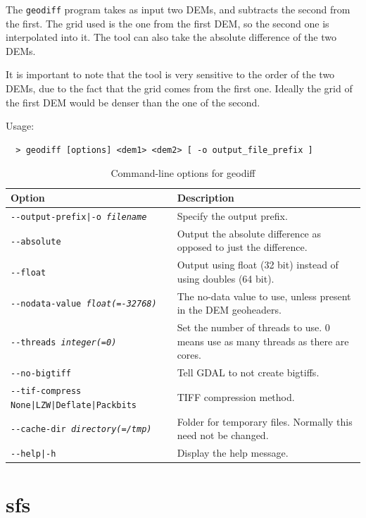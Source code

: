 The \texttt{geodiff} program takes as input two DEMs, and subtracts the second from the first. The grid used is the one from the first DEM, so the second one is interpolated into it. The tool can also take the absolute difference of the two DEMs.

It is important to note that the tool is very sensitive to the order of
the two DEMs, due to the fact that the grid comes from the first one. Ideally the grid of the first DEM would be denser than the one of the second.

\medskip

Usage:
\begin{verbatim}
  > geodiff [options] <dem1> <dem2> [ -o output_file_prefix ]
\end{verbatim}

\begin{longtable}{|l|p{7.5cm}|}
\caption{Command-line options for geodiff}
\label{tbl:geodiff}
\endfirsthead
\endhead
\endfoot
\endlastfoot
\hline
Option & Description \\ \hline \hline
\texttt{-\/-output-prefix|-o \textit{filename}} & Specify the output prefix. \\ \hline
\texttt{-\/-absolute} & Output the absolute difference as opposed to just the difference. \\ \hline
\texttt{-\/-float} & Output using float (32 bit) instead of using doubles (64 bit). \\ \hline
\texttt{-\/-nodata-value \textit{float(=-32768)}} & The no-data value to use, unless present in the DEM geoheaders. \\ \hline
\texttt{-\/-threads \textit{integer(=0)}} & Set the number of threads to use. 0 means use as many threads as there are cores.\\ \hline
\texttt{-\/-no-bigtiff} & Tell GDAL to not create bigtiffs.\\ \hline
\texttt{-\/-tif-compress None|LZW|Deflate|Packbits} & TIFF compression method.\\ \hline
\texttt{-\/-cache-dir \textit{directory(=/tmp)}} & Folder for temporary files. Normally this need not be changed.\\ \hline
\hline
\texttt{-\/-help|-h} & Display the help message. \\ \hline
\end{longtable}

\section{sfs}
\label{sfs}

